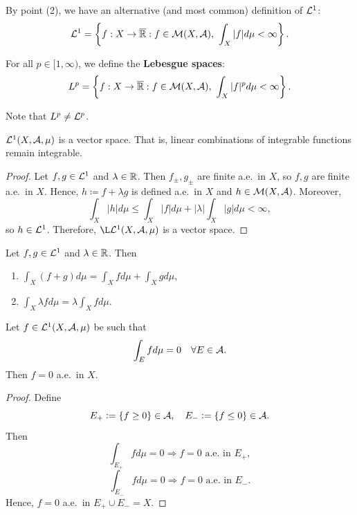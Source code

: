 \begin{definition}
By point (2), we have an alternative (and most common) definition of $\mathcal{L}^1$:
\[
\mathcal{L}^1 = \left\{ f : X \to \overline{\mathbb{R}} : f \in \mathcal{M}(X, \mathcal{A}),\ \int_X |f|  d\mu < \infty \right\}.
\]

For all $p \in [1, \infty)$, we define the \textbf{Lebesgue spaces}:
\[
L^p = \left\{ f : X \to \Rext : f \in \M(X, \A),\ \int_X |f|^p  d\mu < \infty \right\}.
\]
\end{definition}

\begin{remark}
Note that $L^p \neq \mathcal{L}^p$.
\end{remark}

\begin{proposition}
$\mathcal{L}^1(X, \mathcal{A}, \mu)$ is a vector space. That is, linear combinations of integrable functions remain integrable.
\end{proposition}

\begin{proof}
Let $f, g \in \mathcal{L}^1$ and $\lambda \in \mathbb{R}$. Then $f_\pm, g_\pm$ are finite a.e.\ in $X$, so $f, g$ are finite a.e.\ in $X$. Hence, $h \coloneqq f + \lambda g$ is defined a.e.\ in $X$ and $h \in \mathcal{M}(X, \mathcal{A})$. Moreover,
\[
\int_X |h|  d\mu \leq \int_X |f|  d\mu + |\lambda| \int_X |g|  d\mu < \infty,
\]
so $h \in \mathcal{L}^1$. Therefore, $\L\LL^1(X, \A, \mu)$ is a vector space.
\end{proof}

\begin{remark}
Let $f, g \in \mathcal{L}^1$ and $\lambda \in \mathbb{R}$. Then
\begin{enumerate}
    \item $\int_X (f + g)  d\mu = \int_X f  d\mu + \int_X g  d\mu$,
    \item $\int_X \lambda f  d\mu = \lambda \int_X f  d\mu$.
\end{enumerate}
\end{remark}

\begin{lemma}
Let $f \in \mathcal{L}^1(X, \mathcal{A}, \mu)$ be such that
\[
\int_E f  d\mu = 0 \quad \forall E \in \mathcal{A}.
\]
Then $f = 0$ a.e.\ in $X$.
\end{lemma}

\begin{proof}
Define
\[
E_+ \mathrel{\mathop:}= \{ f \geq 0 \} \in \mathcal{A}, \quad E_- \mathrel{\mathop:}= \{ f \leq 0 \} \in \mathcal{A}.
\]
Then
\[
\int_{E_+} f  d\mu = 0 \Rightarrow f = 0 \text{ a.e.\ in } E_+,
\]
\[
\int_{E_-} f  d\mu = 0 \Rightarrow f = 0 \text{ a.e.\ in } E_-.
\]
Hence, $f = 0$ a.e.\ in $E_+ \cup E_- = X$.
\end{proof}

